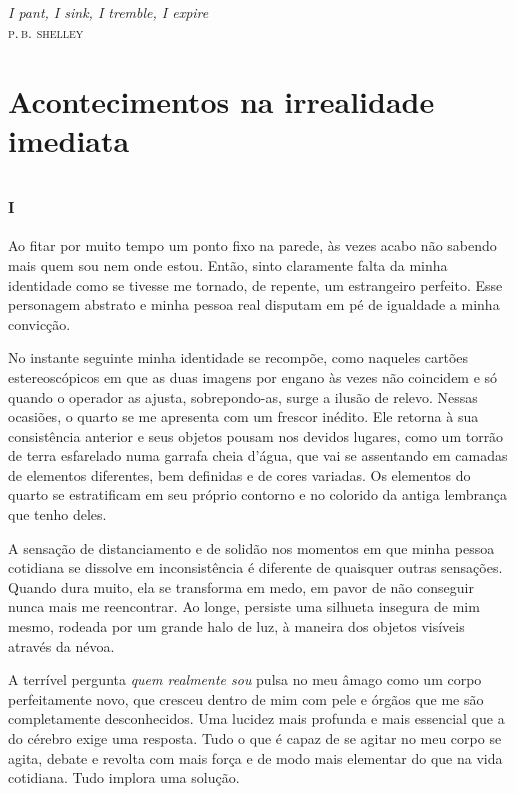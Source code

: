 \chapter*{}
\thispagestyle{empty}

\vfill
\begin{flushright}
\textit{I pant, I sink, I tremble, I expire}\\
{\centering\textsc{p.\,b. shelley}}
\end{flushright}

\part{Acontecimentos na irrealidade imediata}

\openany
\chapter*{\huge\centering\textsc{i}}

Ao fitar por muito tempo um ponto fixo na parede, às vezes acabo não sabendo mais quem sou nem onde estou. Então, sinto claramente falta da minha identidade como se tivesse me tornado, de repente, um estrangeiro perfeito. Esse personagem abstrato e minha pessoa real disputam em pé de igualdade a minha convicção.

No instante seguinte minha identidade se recompõe, como naqueles cartões estereoscópicos em que as duas imagens por engano às vezes não coincidem e só quando o operador as ajusta, sobrepondo-as, surge a ilusão de relevo. Nessas ocasiões, o quarto se me apresenta com um frescor inédito. Ele retorna à sua consistência anterior e seus objetos pousam nos devidos lugares, como um torrão de terra esfarelado numa garrafa cheia d'água, que vai se assentando em camadas de elementos diferentes, bem definidas e de cores variadas. Os elementos do quarto se estratificam em seu próprio contorno e no colorido da antiga lembrança que tenho deles.

A sensação de distanciamento e de solidão nos momentos em que minha pessoa cotidiana se dissolve em inconsistência é diferente de quaisquer outras sensações. Quando dura muito, ela se transforma em medo, em pavor de não conseguir nunca mais me reencontrar. Ao longe, persiste uma silhueta insegura de mim mesmo, rodeada por um grande halo de luz, à maneira dos objetos visíveis através da névoa.

A terrível pergunta \textit{quem realmente sou} pulsa no meu âmago como um corpo perfeitamente novo, que cresceu dentro de mim com pele e órgãos que me são completamente desconhecidos. Uma lucidez mais profunda e mais essencial que a do cérebro exige uma resposta. Tudo o que é capaz de se agitar no meu corpo se agita, debate e revolta com mais força e de modo mais elementar do que na vida cotidiana. Tudo implora uma solução.

